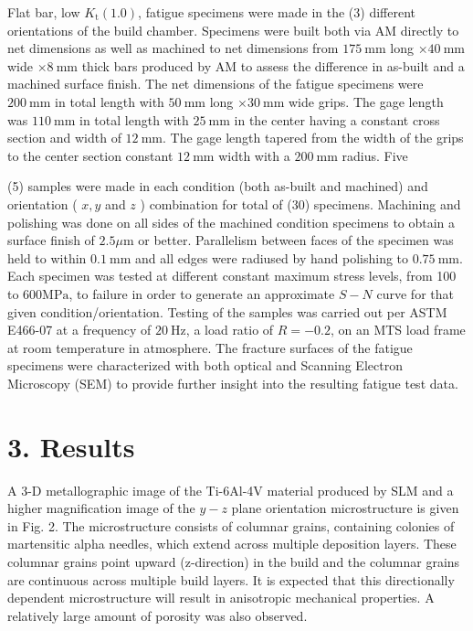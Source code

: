 \documentclass[10pt]{article}
\begin{document}
Flat bar, low $K_{\mathrm{t}}(1.0)$, fatigue specimens were made in the (3) different orientations of the build chamber. Specimens were built both via AM directly to net dimensions as well as machined to net dimensions from $175 \mathrm{~mm}$ long $\times 40 \mathrm{~mm}$ wide $\times 8 \mathrm{~mm}$ thick bars produced by AM to assess the difference in as-built and a machined surface finish. The net dimensions of the fatigue specimens were $200 \mathrm{~mm}$ in total length with $50 \mathrm{~mm}$ long $\times 30 \mathrm{~mm}$ wide grips. The gage length was $110 \mathrm{~mm}$ in total length with $25 \mathrm{~mm}$ in the center having a constant cross section and width of $12 \mathrm{~mm}$. The gage length tapered from the width of the grips to the center section constant $12 \mathrm{~mm}$ width with a $200 \mathrm{~mm}$ radius. Five

(5) samples were made in each condition (both as-built and machined) and orientation ( $x, y$ and $z$ ) combination for total of (30) specimens. Machining and polishing was done on all sides of the machined condition specimens to obtain a surface finish of $2.5 \mu \mathrm{m}$ or better. Parallelism between faces of the specimen was held to within $0.1 \mathrm{~mm}$ and all edges were radiused by hand polishing to $0.75 \mathrm{~mm}$. Each specimen was tested at different constant maximum stress levels, from 100 to $600 \mathrm{MPa}$, to failure in order to generate an approximate $S-N$ curve for that given condition/orientation. Testing of the samples was carried out per ASTM E466-07 at a frequency of $20 \mathrm{~Hz}$, a load ratio of $R=-0.2$, on an MTS load frame at room temperature in atmosphere. The fracture surfaces of the fatigue specimens were characterized with both optical and Scanning Electron Microscopy (SEM) to provide further insight into the resulting fatigue test data.

\section*{3. Results}
A 3-D metallographic image of the Ti-6Al-4V material produced by SLM and a higher magnification image of the $y-z$ plane orientation microstructure is given in Fig. 2. The microstructure consists of columnar grains, containing colonies of martensitic alpha needles, which extend across multiple deposition layers. These columnar grains point upward (z-direction) in the build and the columnar grains are continuous across multiple build layers. It is expected that this directionally dependent microstructure will result in anisotropic mechanical properties. A relatively large amount of porosity was also observed.
\end{document}
